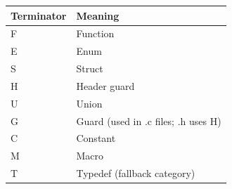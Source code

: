 \begin{NxLightBox}[title={Terminator Summary}]
	\begin{tabularx}{\linewidth}{|l|X|}
		\hline
		\textbf{Terminator} & \textbf{Meaning} \\
		\hline
		F & Function \\
		\hline
		E & Enum \\
		\hline
		S & Struct \\
		\hline
		H & Header guard \\
		\hline
		U & Union \\
		\hline
		G & Guard (used in .c files; .h uses H) \\
		\hline
		C & Constant \\
		\hline
		M & Macro \\
		\hline
		T & Typedef (fallback category) \\
		\hline
	\end{tabularx}
\end{NxLightBox}

